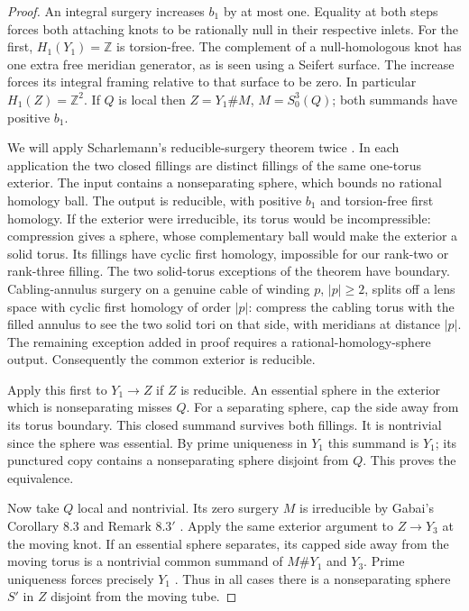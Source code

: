 \documentclass[11pt,letterpaper]{article}
\numberwithin{equation}{section}
\theoremstyle{remark}
\begin{document}
\begin{proof}
An integral surgery increases \(b_1\) by at most one. Equality at both
steps forces both attaching knots to be rationally null in their
respective inlets. For the first, \(H_1(Y_1)=\mathbb Z\) is torsion-free.
The complement of a null-homologous knot has one extra free meridian
generator, as is seen using a Seifert surface. The increase forces its
integral framing relative to that surface to be zero. In particular
\(H_1(Z)=\mathbb Z^2\). If \(Q\) is local then
\(Z=Y_1\#M\), \(M=S^3_0(Q)\); both summands have positive \(b_1\).

We will apply Scharlemann's reducible-surgery theorem twice
\cite[Theorem 6.1 and correction added in proof, pp.~497--500]{Scharlemann1990Reducible}.
In each application the two closed fillings are distinct fillings of
the same one-torus exterior. The input contains a nonseparating sphere,
which bounds no rational homology ball. The output is reducible, with
positive \(b_1\) and torsion-free first homology. If the exterior were
irreducible, its torus would be incompressible: compression gives a
sphere, whose complementary ball would make the exterior a solid
torus. Its fillings have cyclic first homology, impossible for our
rank-two or rank-three filling. The two solid-torus exceptions of
the theorem have boundary. Cabling-annulus surgery on a genuine cable
of winding \(p\), \(\lvert p\rvert\ge2\), splits off a lens space
with cyclic first homology of order \(\lvert p\rvert\): compress the
cabling torus with the filled annulus to see the two solid tori on that
side, with meridians at distance \(\lvert p\rvert\).
The remaining exception added in proof requires a rational-homology-sphere
output. Consequently the common exterior is reducible.

Apply this first to \(Y_1\to Z\) if \(Z\) is reducible. An essential
sphere in the exterior which is nonseparating misses \(Q\).
For a separating sphere, cap the side away from its torus boundary.
This closed summand survives both fillings. It is nontrivial since
the sphere was essential. By prime uniqueness in \(Y_1\) this summand
is \(Y_1\); its punctured copy contains a nonseparating sphere disjoint
from \(Q\). This proves the equivalence.

Now take \(Q\) local and nontrivial. Its zero surgery \(M\) is
irreducible by Gabai's Corollary 8.3 and Remark \(8.3'\)
\cite{Gabai1987FoliationsIII}. Apply the same exterior argument to
\(Z\to Y_3\) at the moving knot. If an essential sphere separates,
its capped side away from the moving torus is a nontrivial common summand
of \(M\#Y_1\) and \(Y_3\). Prime uniqueness forces precisely \(Y_1\)
\cite{Milnor1962Prime}. Thus in all cases there is a nonseparating
sphere \(S'\) in \(Z\) disjoint from the moving tube.


\end{proof}
\end{document}
